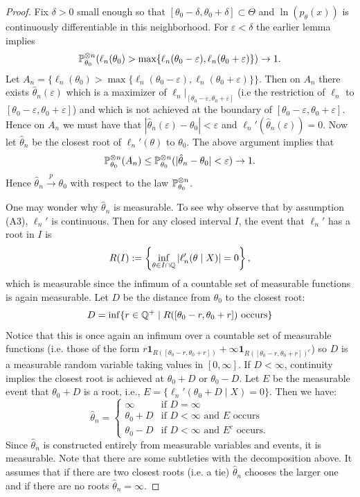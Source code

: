 \begin{proof}
	Fix $\delta > 0$ small enough so that $[\theta_0 - \delta, \theta_0 + \delta] \subset \Theta$ and $\ln(p_\theta(x))$ is continuously differentiable in this neighborhood. For $\varepsilon < \delta$ the earlier lemma implies \[
	\mathbb{P}^{\otimes n}_{\theta_0}(\ell_n(\theta_0) > \max\{\ell_n(\theta_0 - \varepsilon), \ell_n(\theta_0 + \varepsilon)\}) \to 1.
	\] Let $A_n = \{\ell_n(\theta_0) > \max\{\ell_n(\theta_0 - \varepsilon), \ell_n(\theta_0 + \varepsilon)\}\}$. Then on $A_n$ there exists $\hat \theta_n(\varepsilon)$ which is a maximizer of $\ell_n |_{[\theta_0 - \varepsilon, \theta_0 + \varepsilon]}$ (i.e the restriction of $\ell_n$ to $[\theta_0 - \varepsilon, \theta_0 + \varepsilon]$) and which is not achieved at the boundary of $[\theta_0 - \varepsilon, \theta_0 + \varepsilon]$. Hence on $A_n$ we must have that $|\hat \theta_n(\varepsilon) - \theta_0| < \varepsilon$ and $\ell_n'(\hat \theta_n(\varepsilon)) = 0$. Now let $\hat \theta_n$ be the closest root of $\ell_n'(\theta)$ to $\theta_0$. The above argument implies that \[
	\mathbb{P}^{\otimes n}_{\theta_0}(A_n) \leq \mathbb{P}^{\otimes n}_{\theta_0}(|\hat \theta_n - \theta_0| < \varepsilon) \to 1.
	\] Hence $\hat \theta_n \overset{p}{\to} \theta_0$ with respect to the law $\mathbb{P}^{\otimes n}_{\theta_0}$. 
	
	\medskip \noindent One may wonder why $\hat \theta_n$ is measurable.  To see why observe that by assumption (A3), $\ell_n'$ is continuous. Then for any closed interval $I$, the event that $\ell_n'$ has a root in $I$ is 
	\[
	R(I) := \left\{ \inf_{\theta \in I \cap \mathbb{Q}} |\ell_n'(\theta \mid X)| = 0 \right\},
	\] 
	which is measurable since the infimum of a countable set of measurable functions is again measurable. Let $D$ be the distance from $\theta_0$ to the closest root:
	\[
	D = \inf \{ r \in \mathbb{Q}^+ \mid R([\theta_0 - r, \theta_0 + r]) \text{ occurs} \} 
	\]
	Notice that this is once again an infimum over a countable set of measurable functions (i.e. those of the form $r \mathbf{1}_{R([\theta_0 - r, \theta_0 + r])} + \infty \mathbf{1}_{R([\theta_0 - r, \theta_0 + r])^c}$) so $D$ is a measurable random variable taking values in $[0, \infty]$. If $D < \infty$, continuity implies the closest root is achieved at $\theta_0 + D$ or $\theta_0 - D$. Let $E$ be the measurable event that $\theta_0 + D$ is a root, i.e., $E = \{ \ell_n'(\theta_0 + D \mid X) = 0 \}$. Then we have:
	\[
	\hat \theta_n = \begin{cases} 
		\infty & \text{if } D = \infty \\ 
		\theta_0 + D & \text{if } D < \infty \text{ and } E \text{ occurs} \\ 
		\theta_0 - D & \text{if } D < \infty \text{ and } E^c \text{ occurs}. 
	\end{cases}
	\]
	Since $\hat \theta_n$ is constructed entirely from measurable variables and events, it is measurable. Note that there are some subtleties with the decomposition above. It assumes that if there are two closest roots (i.e. a tie) $\hat \theta_n$ chooses the larger one and if there are no roots $\hat \theta_n = \infty$.
\end{proof}

